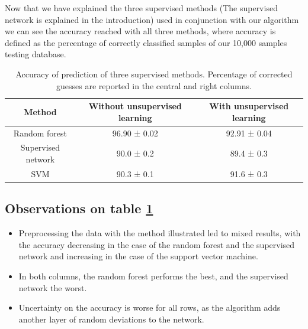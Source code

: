 \documentclass[a4paper]{report}
\begin{document}
Now that we have explained the three supervised methods (The supervised network is explained in the introduction) used in conjunction with our algorithm we can see the accuracy reached with all three methods, where accuracy is defined as the percentage of correctly classified samples of our 10,000 samples testing database.

\begin{table}[h!]
  \begin{center}
    \caption{Accuracy of prediction of three supervised methods. Percentage of corrected guesses are reported in the central and right columns.}
    \begin{tabular}{c|c|c} %
      \textbf{Method} & \textbf{Without unsupervised learning} & \textbf{With unsupervised learning}\\
      \hline
      Random forest & 96.90  ± 0.02 & 92.91 ± 0.04\\
      Supervised network & 90.0 ± 0.2 & 89.4 ± 0.3 \\
      SVM & 90.3 ± 0.1 & 91.6 ± 0.3 \\
    \end{tabular}
    \label{bbb}
  \end{center}
\end{table}

\subsection{Observations on table \ref{bbb}}

\begin{itemize}
    \item Preprocessing the data with the method illustrated led to mixed results, with the accuracy decreasing in the case of the random forest and the supervised network and increasing in the case of the support vector machine.
    \item In both columns, the random forest performs the best, and the supervised network the worst.
    \item Uncertainty on the accuracy is worse for all rows, as the algorithm adds another layer of random deviations to the network.
\end{itemize}
\end{document}
